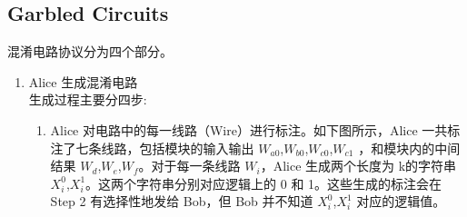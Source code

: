 \subsection{Garbled Circuits}
\noindent 混淆电路协议分为四个部分。
\begin{enumerate}

\item Alice 生成混淆电路\\
生成过程主要分四步:
\begin{enumerate}
\item Alice 对电路中的每一线路（Wire）进行标注。如下图所示，Alice 一共标注了七条线路，包括模块的输入输出 $W_{a0}$,$W_{b0}$,$W_{c0}$,$W_{c1}$
，和模块内的中间结果 $W_{d}$,$W_{e}$,$W_{f}$。对于每一条线路 $W_{i}$，Alice 生成两个长度为 k的字符串 $X^0_{i}$,$X^1_{i}$。这两个字符串分别对应逻辑上的 0 和 1。这些生成的标注会在 Step 2 有选择性地发给 Bob，但 Bob 并不知道 $X^0_{i}$,$X^1_{i}$
 对应的逻辑值。
 

\end{enumerate}
\end{enumerate}
